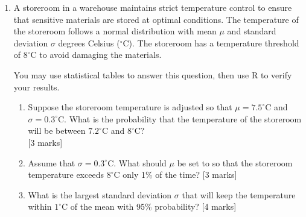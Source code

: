\begin{enumerate}
\begin{enumerate}
%
\item Calculate the expected value and variance of the factory's net savings.
	\hfill [3 marks]

\item What is the probability that the factory will save at least \$27 on a given day?
	\hfill [2~marks]

\end{enumerate}

\vspace{0.5cm}

\item A storeroom in a warehouse maintains strict temperature control to ensure that sensitive materials are stored at optimal conditions. The temperature of the storeroom follows a normal distribution with mean $\mu$ and standard deviation $\sigma$ degrees Celsius ($^{\circ}$C). The storeroom has a temperature threshold of $8^\circ$C to avoid damaging the materials.

You may use statistical tables to answer this question, then use \textsf{R} to verify your results.

\begin{enumerate}
\item Suppose the storeroom temperature is adjusted so that $\mu = 7.5^\circ$C and $\sigma = 0.3^\circ$C. What is the probability that the temperature of the storeroom will be between $7.2^\circ$C and $8^\circ$C?
	\\\phantom{1} \hfill [3 marks]

%
\item Assume that $\sigma=0.3^\circ$C. What should $\mu$ be set to so that the storeroom temperature exceeds $8^\circ$C only 1\% of the time?
	\hfill [3 marks]

\item What is the largest standard deviation $\sigma$ that will keep the temperature within $1^\circ$C of the mean with 95\% probability?
	\hfill [4 marks]

\end{enumerate}
\vspace{0.5cm}


\end{enumerate}
